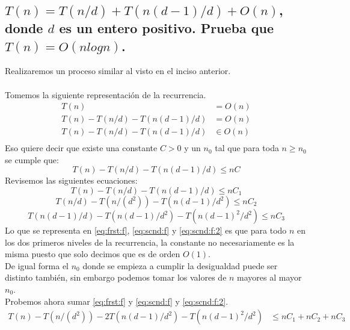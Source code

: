 \documentclass[12pt]{article}
\begin{document}
\subsection{$T(n)=T(n/d) + T(n(d-1)/d) + O(n)$, donde $d$ es un entero positivo. Prueba que $T(n)=O(nlogn)$.}
Realizaremos un proceso similar al visto en el inciso anterior.\\
\paragraph{} Tomemos la siguiente representación de la recurrencia.
\begin{equation}
\begin{split}
T(n) & = O(n) \\
T(n) - T(n/d) - T(n(d-1)/d) & = O(n) \\
T(n) - T(n/d) - T(n(d-1)/d) & \in O(n) \\
\end{split}
\end{equation}
Eso quiere decir que existe una constante $C>0$ y un $n_0$ tal que para toda  $n\geq n_0$ se cumple que:
\begin{equation}
T(n) - T(n/d) - T(n(d-1)/d) \leq nC
\end{equation}
Revisemos las siguientes ecuaciones:
\begin{equation}\label{eq:frst:f}
T(n) - T(n/d) - T(n(d-1)/d) \leq nC_1
\end{equation}
\begin{equation}\label{eq:scnd:f}
T(n/d) - T(n/(d^2)) - T(n(d-1)/d^2) \leq nC_2
\end{equation}
\begin{equation}\label{eq:scnd:f:2}
T(n(d-1)/d) - T(n(d-1)/d^2) - T(n(d-1)^2/d^2) \leq nC_3
\end{equation}
Lo que se representa en \eqref{eq:frst:f}, \eqref{eq:scnd:f} y \eqref{eq:scnd:f:2} es que para todo $n$ en los dos primeros niveles de la recurrencia, la constante no necesariamente es la misma puesto que solo decimos que es de orden $O(1)$.\\
De igual forma el $n_0$ donde se empieza a cumplir la desigualdad puede ser distinto también, sin embargo podemos tomar los valores de $n$ mayores al mayor $n_0$.\\
Probemos ahora sumar \eqref{eq:frst:f} y \eqref{eq:scnd:f} y \eqref{eq:scnd:f:2}.
\begin{equation}\label{eq:thrd:f}
\begin{split}
T(n) - T(n/(d^2)) - 2T(n(d-1)/d^2) - T(n(d-1)^2/d^2) & \leq nC_1 + nC_2 + nC_3\\
\end{split}
\end{equation}
\end{document}
